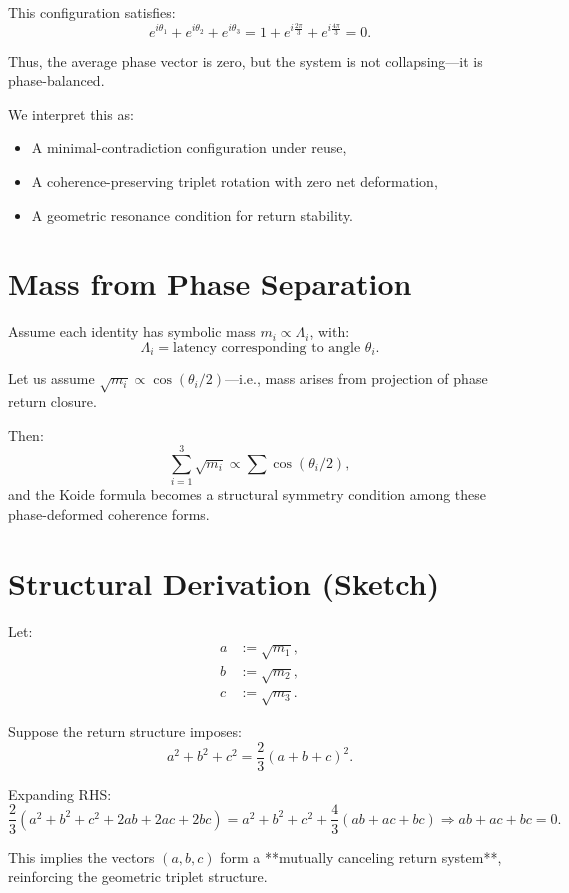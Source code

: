 This configuration satisfies:
\[
e^{i\theta_1} + e^{i\theta_2} + e^{i\theta_3} = 1 + e^{i \frac{2\pi}{3}} + e^{i \frac{4\pi}{3}} = 0.
\]

Thus, the average phase vector is zero, but the system is not collapsing—it is phase-balanced.

We interpret this as:
\begin{itemize}
    \item A minimal-contradiction configuration under reuse,
    \item A coherence-preserving triplet rotation with zero net deformation,
    \item A geometric resonance condition for return stability.
\end{itemize}

\section{Mass from Phase Separation}

Assume each identity has symbolic mass $m_i \propto \Lambda_i$, with:
\[
\Lambda_i = \text{latency corresponding to angle } \theta_i.
\]

Let us assume $\sqrt{m_i} \propto \cos(\theta_i / 2)$—i.e., mass arises from projection of phase return closure.

Then:
\[
\sum_{i=1}^3 \sqrt{m_i} \propto \sum \cos(\theta_i / 2),
\]
and the Koide formula becomes a structural symmetry condition among these phase-deformed coherence forms.

\section{Structural Derivation (Sketch)}

Let:
\begin{align*}
a &:= \sqrt{m_1}, \\
b &:= \sqrt{m_2}, \\
c &:= \sqrt{m_3}.
\end{align*}

Suppose the return structure imposes:
\[
a^2 + b^2 + c^2 = \frac{2}{3}(a + b + c)^2.
\]

Expanding RHS:
\[
\frac{2}{3}(a^2 + b^2 + c^2 + 2ab + 2ac + 2bc) = a^2 + b^2 + c^2 + \frac{4}{3}(ab + ac + bc)
\Rightarrow ab + ac + bc = 0.
\]

This implies the vectors $(a, b, c)$ form a **mutually canceling return system**, reinforcing the geometric triplet structure.


